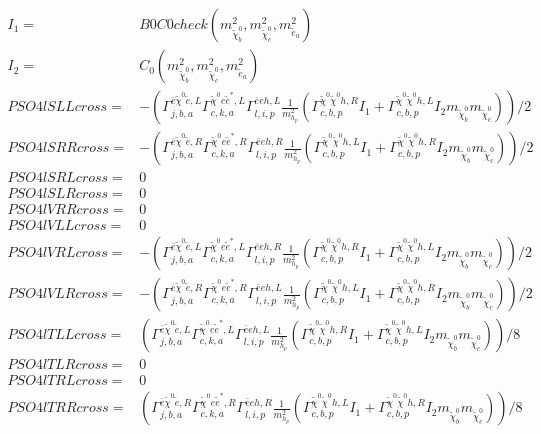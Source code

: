 \documentclass[A4,landscape]{article}
\begin{document}
\begin{align} 
I_1= & B0C0check(m^2_{\tilde{\chi}^0_{{b}}}, m^2_{\tilde{\chi}^0_{{c}}}, m^2_{\tilde{e}_{{a}}}) \\ 
I_2= & C_0(m^2_{\tilde{\chi}^0_{{b}}}, m^2_{\tilde{\chi}^0_{{c}}}, m^2_{\tilde{e}_{{a}}}) \\ 
  PSO4lSLLcross= & -( \Gamma^{\bar{e}\tilde{\chi}^0 \tilde{e} ,L}_{j, b, a} \Gamma^{\tilde{\chi}^0 e \tilde{e}^*,L}_{c, k, a} \Gamma^{\bar{e}e h ,L}_{l, i, p} \frac{1}{m^2_{h_{{p}}}} (\Gamma^{\tilde{\chi}^0 \tilde{\chi}^0 h ,R}_{c, b, p} I_1 + \Gamma^{\tilde{\chi}^0 \tilde{\chi}^0 h ,L}_{c, b, p} I_2 m_{\tilde{\chi}^0_{{b}}} m_{\tilde{\chi}^0_{{c}}}))/2 \\ 
  PSO4lSRRcross= & -( \Gamma^{\bar{e}\tilde{\chi}^0 \tilde{e} ,R}_{j, b, a} \Gamma^{\tilde{\chi}^0 e \tilde{e}^*,R}_{c, k, a} \Gamma^{\bar{e}e h ,R}_{l, i, p} \frac{1}{m^2_{h_{{p}}}} (\Gamma^{\tilde{\chi}^0 \tilde{\chi}^0 h ,L}_{c, b, p} I_1 + \Gamma^{\tilde{\chi}^0 \tilde{\chi}^0 h ,R}_{c, b, p} I_2 m_{\tilde{\chi}^0_{{b}}} m_{\tilde{\chi}^0_{{c}}}))/2 \\ 
  PSO4lSRLcross= & 0 \\ 
  PSO4lSLRcross= & 0 \\ 
  PSO4lVRRcross= & 0 \\ 
  PSO4lVLLcross= & 0 \\ 
  PSO4lVRLcross= & -( \Gamma^{\bar{e}\tilde{\chi}^0 \tilde{e} ,L}_{j, b, a} \Gamma^{\tilde{\chi}^0 e \tilde{e}^*,L}_{c, k, a} \Gamma^{\bar{e}e h ,R}_{l, i, p} \frac{1}{m^2_{h_{{p}}}} (\Gamma^{\tilde{\chi}^0 \tilde{\chi}^0 h ,R}_{c, b, p} I_1 + \Gamma^{\tilde{\chi}^0 \tilde{\chi}^0 h ,L}_{c, b, p} I_2 m_{\tilde{\chi}^0_{{b}}} m_{\tilde{\chi}^0_{{c}}}))/2 \\ 
  PSO4lVLRcross= & -( \Gamma^{\bar{e}\tilde{\chi}^0 \tilde{e} ,R}_{j, b, a} \Gamma^{\tilde{\chi}^0 e \tilde{e}^*,R}_{c, k, a} \Gamma^{\bar{e}e h ,L}_{l, i, p} \frac{1}{m^2_{h_{{p}}}} (\Gamma^{\tilde{\chi}^0 \tilde{\chi}^0 h ,L}_{c, b, p} I_1 + \Gamma^{\tilde{\chi}^0 \tilde{\chi}^0 h ,R}_{c, b, p} I_2 m_{\tilde{\chi}^0_{{b}}} m_{\tilde{\chi}^0_{{c}}}))/2 \\ 
  PSO4lTLLcross= & ( \Gamma^{\bar{e}\tilde{\chi}^0 \tilde{e} ,L}_{j, b, a} \Gamma^{\tilde{\chi}^0 e \tilde{e}^*,L}_{c, k, a} \Gamma^{\bar{e}e h ,L}_{l, i, p} \frac{1}{m^2_{h_{{p}}}} (\Gamma^{\tilde{\chi}^0 \tilde{\chi}^0 h ,R}_{c, b, p} I_1 + \Gamma^{\tilde{\chi}^0 \tilde{\chi}^0 h ,L}_{c, b, p} I_2 m_{\tilde{\chi}^0_{{b}}} m_{\tilde{\chi}^0_{{c}}}))/8 \\ 
  PSO4lTLRcross= & 0 \\ 
  PSO4lTRLcross= & 0 \\ 
  PSO4lTRRcross= & ( \Gamma^{\bar{e}\tilde{\chi}^0 \tilde{e} ,R}_{j, b, a} \Gamma^{\tilde{\chi}^0 e \tilde{e}^*,R}_{c, k, a} \Gamma^{\bar{e}e h ,R}_{l, i, p} \frac{1}{m^2_{h_{{p}}}} (\Gamma^{\tilde{\chi}^0 \tilde{\chi}^0 h ,L}_{c, b, p} I_1 + \Gamma^{\tilde{\chi}^0 \tilde{\chi}^0 h ,R}_{c, b, p} I_2 m_{\tilde{\chi}^0_{{b}}} m_{\tilde{\chi}^0_{{c}}}))/8 \\ 
\end{align} 
\end{document}
